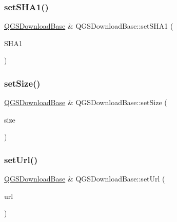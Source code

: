 \mbox{\label{class_q_g_s_download_base_a15846aef72d941c8fad7e9af93a3b860}} 
\subsubsection{\texorpdfstring{set\+S\+H\+A1()}{setSHA1()}}
{\footnotesize\ttfamily \mbox{\hyperlink{class_q_g_s_download_base}{Q\+G\+S\+Download\+Base}} \& Q\+G\+S\+Download\+Base\+::set\+S\+H\+A1 (\begin{DoxyParamCaption}\item[{const Q\+String \&}]{S\+H\+A1 }\end{DoxyParamCaption})}

\mbox{\label{class_q_g_s_download_base_a5698f198e6f837920861da6948dad47e}} 
\subsubsection{\texorpdfstring{set\+Size()}{setSize()}}
{\footnotesize\ttfamily \mbox{\hyperlink{class_q_g_s_download_base}{Q\+G\+S\+Download\+Base}} \& Q\+G\+S\+Download\+Base\+::set\+Size (\begin{DoxyParamCaption}\item[{const int}]{size }\end{DoxyParamCaption})}

\mbox{\label{class_q_g_s_download_base_ae35bbc6d7d2e227e9002cd5a8c7a432f}} 
\subsubsection{\texorpdfstring{set\+Url()}{setUrl()}}
{\footnotesize\ttfamily \mbox{\hyperlink{class_q_g_s_download_base}{Q\+G\+S\+Download\+Base}} \& Q\+G\+S\+Download\+Base\+::set\+Url (\begin{DoxyParamCaption}\item[{const Q\+Url \&}]{url }\end{DoxyParamCaption})}



